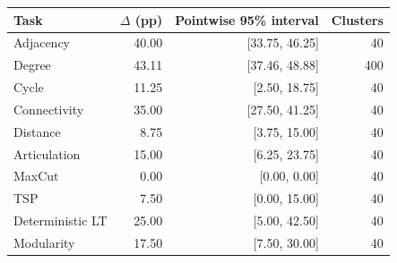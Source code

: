 \begin{tabular}{lrrr}
\toprule
Task & $\Delta$ (pp) & Pointwise 95\% interval & Clusters \\
\midrule
Adjacency & 40.00 & [33.75, 46.25] & 40 \\
Degree & 43.11 & [37.46, 48.88] & 400 \\
Cycle & 11.25 & [2.50, 18.75] & 40 \\
Connectivity & 35.00 & [27.50, 41.25] & 40 \\
Distance & 8.75 & [3.75, 15.00] & 40 \\
Articulation & 15.00 & [6.25, 23.75] & 40 \\
MaxCut & 0.00 & [0.00, 0.00] & 40 \\
TSP & 7.50 & [0.00, 15.00] & 40 \\
Deterministic LT & 25.00 & [5.00, 42.50] & 40 \\
Modularity & 17.50 & [7.50, 30.00] & 40 \\
\bottomrule
\end{tabular}
